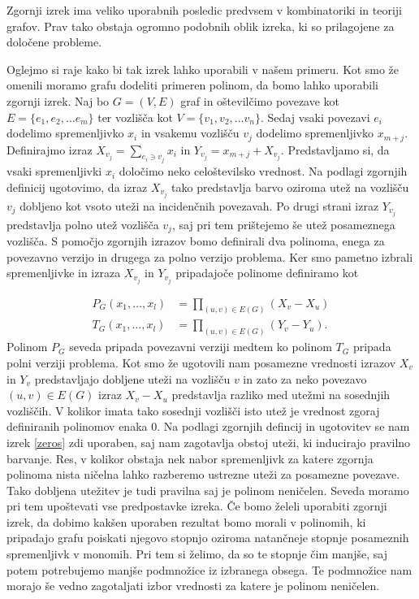 \documentclass[12pt,a4paper,twoside]{article}
\theoremstyle{definition} %
\theoremstyle{plain} %
\numberwithin{equation}{section}  %
\begin{document}
Zgornji izrek ima veliko uporabnih posledic predvsem v kombinatoriki in teoriji grafov. Prav tako obstaja ogromno podobnih oblik izreka, ki so prilagojene za določene probleme.

Oglejmo si raje kako bi tak izrek lahko uporabili v našem primeru. Kot smo že omenili moramo grafu dodeliti primeren polinom, da bomo lahko uporabili zgornji izrek. Naj bo $G = (V, E)$ graf in oštevilčimo povezave kot $E = \{e_1, e_2, \ldots e_m \}$ ter vozlišča kot $V = \{v_1, v_2, \ldots v_n\}$. Sedaj vsaki povezavi $e_i$ dodelimo spremenljivko $x_i$ in vsakemu vozlišču  $v_j$ dodelimo spremenljivko $x_{m + j}$. Definirajmo izraz $X_{v_j} = \sum_{e_i \ni v_j} x_i$ in $Y_{v_j} = x_{m+j} + X_{v_j}$. Predstavljamo si, da vsaki spremenljivki $x_i$ določimo neko celoštevilsko vrednost. Na podlagi zgornjih definicij ugotovimo, da izraz $X_{v_j}$ tako predstavlja barvo oziroma utež na vozlišču $v_j$ dobljeno kot vsoto uteži na incidenčnih povezavah. Po drugi strani izraz $Y_{v_j}$ predstavlja polno utež vozlišča $v_j$, saj pri tem prištejemo še utež posameznega vozlišča. S pomočjo zgornjih izrazov bomo definirali dva polinoma, enega za povezavno verzijo in drugega za polno verzijo problema. Ker smo pametno izbrali spremenljivke in izraza $X_{v_j}$ in $Y_{v_j}$ pripadajoče polinome definiramo kot

\begin{equation*}
\begin{split}
P_{G}(x_1, \ldots, x_l) &= \prod_{(u, v) \in E(G)} \left( X_v- X_u \right) \\
T_{G}(x_1, \ldots, x_l) &= \prod_{(u, v) \in E(G)} \left( Y_v- Y_u \right).
\end{split}
\end{equation*}
Polinom $P_G$ seveda pripada povezavni verziji medtem ko polinom $T_G$ pripada polni verziji problema. Kot smo že ugotovili nam posamezne vrednosti izrazov $X_v$ in $Y_v$ predstavljajo dobljene uteži na vozlišču $v$ in zato za neko povezavo $(u,v) \in E(G)$ izraz $X_v - X_u$ predstavlja razliko med utežmi na sosednjih vozliščih. V kolikor imata tako sosednji vozlišči isto utež je vrednost zgoraj definiranih polinomov enaka $0$. Na podlagi zgornjih defincij in ugotovitev se nam izrek \ref{zeros} zdi uporaben, saj nam zagotavlja obstoj uteži, ki inducirajo pravilno barvanje. Res, v kolikor obstaja nek nabor spremenljivk za katere zgornja polinoma nista ničelna lahko razberemo ustrezne uteži za posamezne povezave. Tako dobljena utežitev je tudi pravilna saj je polinom neničelen. Seveda moramo pri tem upoštevati vse predpostavke izreka. Če bomo želeli uporabiti zgornji izrek, da dobimo kakšen uporaben rezultat bomo morali v polinomih, ki pripadajo grafu poiskati njegovo stopnjo oziroma natančneje stopnje posameznih spremenljivk v monomih. Pri tem si želimo, da so te stopnje čim manjše, saj potem potrebujemo manjše podmnožice iz izbranega obsega. Te podmnožice nam morajo še vedno zagotaljati izbor vrednosti za katere je polinom neničelen.
\end{document}
